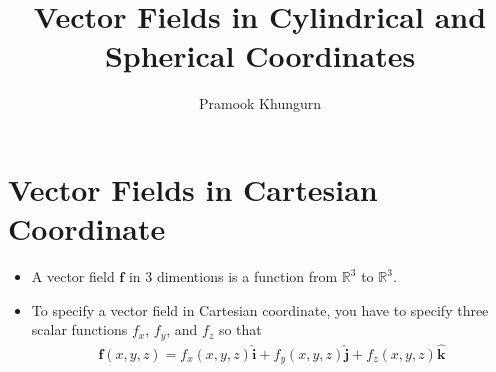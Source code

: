 \documentclass[10pt]{article}
\title{Vector Fields in Cylindrical and Spherical Coordinates}
\author{Pramook Khungurn}
\newcommand{\ve}[1]{\mathbf{#1}}
\begin{document}
  \maketitle  

  \section{Vector Fields in Cartesian Coordinate}  
  \begin{itemize}
    \item A vector field $\ve{f}$ in 3 dimentions is a function from $\mathbb{R}^3$ to $\mathbb{R}^3$.

    \item To specify a vector field in Cartesian coordinate, you have to specify three scalar functions $f_x$, $f_y$, and $f_z$ so that
    \begin{align*}
      \ve{f}(x,y,z) = f_x(x,y,z) \hat{\ve{i}} + f_y(x,y,z) \hat{\ve{j}} + f_z(x,y,z) \hat{\ve{k}}
    \end{align*}    
  \end{itemize}
\end{document}

